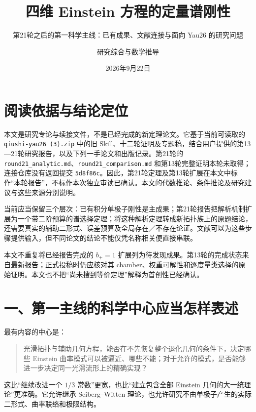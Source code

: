 \documentclass[
  11pt,
  a4paper,
  fontset=none]{ctexart}
\title{四维 Einstein 方程的定量谱刚性}
\subtitle{第21轮之后的第一科学主线：已有成果、文献连接与面向 Yau26
的研究问题}
\author{研究综合与数学推导}
\date{2026年9月22日}
\begin{document}
\maketitle

{
\setcounter{tocdepth}{1}
\small
\setlength{\parskip}{0pt}
\tableofcontents
}
\clearpage
\section{阅读依据与结论定位}\label{ux9605ux8bfbux4f9dux636eux4e0eux7ed3ux8bbaux5b9aux4f4d}

本文是研究专论与续接文件，不是已经完成的新定理论文。它基于当前可读取的
\nolinkurl{qiushi-yau26 (3).zip} 中的旧
Skill、十二轮证明及专题稿，结合用户提供的第13---21轮研究报告，以及下列一手论文和出版记录。第21轮的
\nolinkurl{round21_analytic.md}、\nolinkurl{round21_comparison.md}
和第13轮完整证明本轮未取得；连接仓库没有返回提交
\nolinkurl{5d8f86c}。因此，第21轮定理及第13轮扩展在本文中标作``本轮报告''，不标作本次独立审读已确认。本文的代数推论、条件推论及研究建议与这些来源分别说明。

当前应当保留三个层次：已有积分单极子刚性是主成果；第21轮报告把解析机制扩展为一个带二阶预算的谱选择定理；将这种解析定理转成新拓扑族上的原题结论，还需要真实的辅助二形式、误差预算及全局存在／不存在论证。文献可以为这些步骤提供输入，但不同论文的结论不能仅凭名称相关便直接串联。

本文不重复将已经报告完成的 \(b_+=1\)
扩展列为待发现成果。第13轮的完成状态来自最新报告；正式投稿时仍应核对其
chamber、权重可解性和逐度量类选择的原始证明。本文也不把``尚未搜到等价定理''解释为首创性已经确认。

\section{一、第一主线的科学中心应当怎样表述}\label{ux4e00ux7b2cux4e00ux4e3bux7ebfux7684ux79d1ux5b66ux4e2dux5fc3ux5e94ux5f53ux600eux6837ux8868ux8ff0}

最有内容的中心是：

\begin{quote}
光滑拓扑与辅助几何方程，能否在不先恢复整个退化几何的条件下，决定哪些
Einstein
曲率模式可以被逼近、哪些不能；对于允许的模式，是否能够进一步决定同一光滑流形上的精确实现？
\end{quote}

这比``继续改进一个 \(1/3\) 常数''更宽，也比``建立包含全部 Einstein
几何的大一统理论''更准确。它允许继承 Seiberg--Witten
理论，也允许研究不由单极子产生的实际二形式、曲率联络和极限结构。
\end{document}
